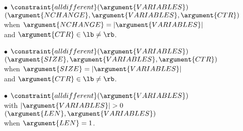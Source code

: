\begin{ctrdesc}
 \begin{minipage}[t]{11.2cm}
$\bullet$ $\constraint{alldifferent}(\argument{VARIABLES})$\\
\hspace*{7pt}{\bf implies}\hspace*{1pt} $ $\hyperlink{Ccircular_change}{}$(\argument{NCHANGE},\argument{VARIABLES},\argument{CTR})$\\
 \hspace*{10pt} when\hspace*{3pt} $\argument{NCHANGE}=|\argument{VARIABLES}|$\\
 \hspace*{10pt} and\hspace*{9pt} $\argument{CTR}\in \lb\neq \rb$.
\end{minipage}
\vspace{0.16cm}

 \begin{minipage}[t]{11.2cm}
$\bullet$ $\constraint{alldifferent}(\argument{VARIABLES})$\\
\hspace*{7pt}{\bf implies}\hspace*{1pt} $ $\hyperlink{Clongest_change}{}$(\argument{SIZE},\argument{VARIABLES},\argument{CTR})$\\
 \hspace*{10pt} when\hspace*{3pt} $\argument{SIZE}=|\argument{VARIABLES}|$\\
 \hspace*{10pt} and\hspace*{9pt} $\argument{CTR}\in \lb\neq \rb$.
\end{minipage}
\vspace{0.16cm}

 \begin{minipage}[t]{11.2cm}
$\bullet$ $\constraint{alldifferent}(\argument{VARIABLES})$\\
 \hspace*{10pt} with\hspace*{3pt} $|\argument{VARIABLES}|>0$\\
\hspace*{7pt}{\bf implies}\hspace*{1pt} $ $\hyperlink{Clength_first_sequence}{}$(\argument{LEN},\argument{VARIABLES})$\\
 \hspace*{10pt} when\hspace*{3pt} $\argument{LEN}=1$.
\end{minipage}
\vspace{0.16cm}


\end{ctrdesc}
